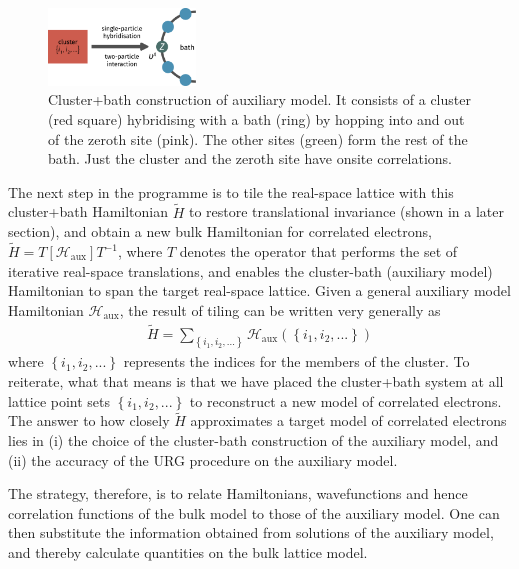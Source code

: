 \documentclass[reprint,hidelinks,onecolumn]{revtex4-2}
\begin{document}
\begin{figure}[!htb]
 	\centering
 	\includegraphics[width=0.35\textwidth]{gen_siam.pdf}
 	\caption{Cluster+bath construction of auxiliary model. It consists of a cluster (red square) hybridising with a bath (ring) by hopping into and out of the zeroth site (pink). The other sites (green) form the rest of the bath. Just the cluster and the zeroth site have onsite correlations.}
 \end{figure}
 The next step in the programme is to tile the real-space lattice with this cluster+bath Hamiltonian \(\tilde H\) to restore translational invariance (shown in a later section), and obtain a new bulk Hamiltonian for correlated electrons, $\tilde H = T\left[ \mathcal{H}_\text{aux} \right] T^{-1}$, where $T$ denotes the operator that performs the set of iterative real-space translations, and enables the cluster-bath (auxiliary model) Hamiltonian to span the target real-space lattice. Given a general auxiliary model Hamiltonian \(\mathcal{H}_\text{aux}\), the result of tiling can be written very generally as
 \begin{equation}\begin{aligned}
	 \tilde H = \sum_{\left\{i_1,i_2,...\right\}} \mathcal{H}_\text{aux}\left(\left\{i_1,i_2,...\right\}\right)
 \end{aligned}\end{equation}
where \(\left\{i_1,i_2,...\right\}\) represents the indices for the members of the cluster. To reiterate, what that means is that we have placed the cluster+bath system at all lattice point sets \(\left\{i_1,i_2,...\right\}\) to reconstruct a new model of correlated electrons. The answer to how closely $\tilde H$ approximates a target model of correlated electrons lies in (i) the choice of the cluster-bath construction of the auxiliary model, and (ii) the accuracy of the URG procedure on the auxiliary model.

The strategy, therefore, is to relate Hamiltonians, wavefunctions and hence correlation functions of the bulk model to those of the auxiliary model. One can then substitute the information obtained from solutions of the auxiliary model, and thereby calculate quantities on the bulk lattice model.
\end{document}
